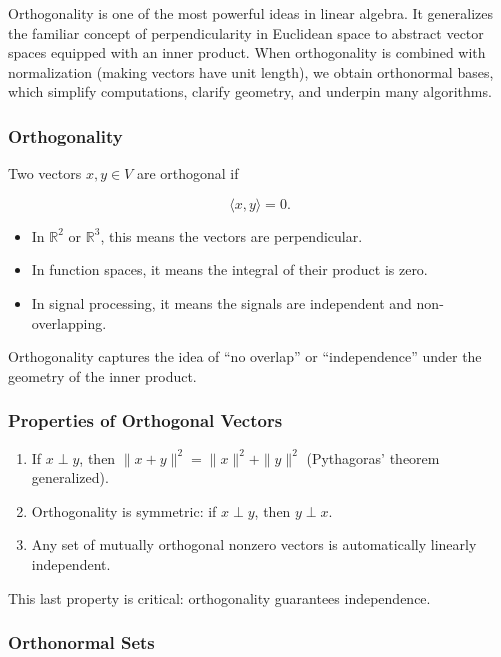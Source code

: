 \documentclass[
  letterpaper,
  DIV=11,
  numbers=noendperiod]{scrreprt}
\providecommand{\tightlist}{%
  \setlength{\itemsep}{0pt}\setlength{\parskip}{0pt}}
\begin{document}
Orthogonality is one of the most powerful ideas in linear algebra. It
generalizes the familiar concept of perpendicularity in Euclidean space
to abstract vector spaces equipped with an inner product. When
orthogonality is combined with normalization (making vectors have unit
length), we obtain orthonormal bases, which simplify computations,
clarify geometry, and underpin many algorithms.

\subsubsection{Orthogonality}\label{orthogonality-1}

Two vectors \(x, y \in V\) are orthogonal if

\[
\langle x, y \rangle = 0.
\]

\begin{itemize}
\tightlist
\item
  In \(\mathbb{R}^2\) or \(\mathbb{R}^3\), this means the vectors are
  perpendicular.
\item
  In function spaces, it means the integral of their product is zero.
\item
  In signal processing, it means the signals are independent and
  non-overlapping.
\end{itemize}

Orthogonality captures the idea of ``no overlap'' or ``independence''
under the geometry of the inner product.

\subsubsection{Properties of Orthogonal
Vectors}\label{properties-of-orthogonal-vectors}

\begin{enumerate}
\def\labelenumi{\arabic{enumi}.}
\tightlist
\item
  If \(x \perp y\), then \(\|x+y\|^2 = \|x\|^2 + \|y\|^2\) (Pythagoras'
  theorem generalized).
\item
  Orthogonality is symmetric: if \(x \perp y\), then \(y \perp x\).
\item
  Any set of mutually orthogonal nonzero vectors is automatically
  linearly independent.
\end{enumerate}

This last property is critical: orthogonality guarantees independence.

\subsubsection{Orthonormal Sets}\label{orthonormal-sets}
\end{document}
